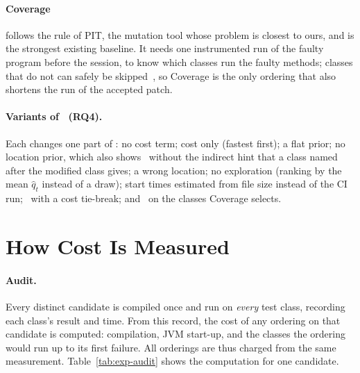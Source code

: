\paragraph{Coverage} follows the rule of PIT, the mutation tool whose problem is
closest to ours, and is the strongest existing baseline. It needs one instrumented run of
the faulty program before the session, to know which classes run the faulty
methods; classes that do not can safely be skipped~\citep{rothermel2001prioritizing},
so Coverage is the only ordering that also shortens the run of the accepted
patch.

\paragraph{Variants of \km\ (RQ4).} Each changes one part of \km: no cost
term; cost only (fastest first); a flat prior; no location prior, which also
shows \km\ without the indirect hint that a class named after the modified
class gives; a wrong location; no exploration (ranking by the mean $\hat q_t$ instead of a draw); start
times estimated from file size instead of the CI run; \frtp\ with a cost
tie-break; and \km\ on the classes Coverage selects.

\section{How Cost Is Measured}
\label{sec:exp-measure}

\paragraph{Audit.} Every distinct candidate is compiled once and run on
\emph{every} test class, recording each class's result and time. From this
record, the cost of any ordering on that candidate is computed: compilation,
JVM start-up, and the classes the ordering would run up to its first failure.
All orderings are thus charged from the same measurement.
Table~\ref{tab:exp-audit} shows the computation for one candidate.

